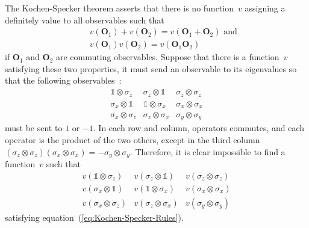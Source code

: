 \documentclass[english,reprint, aps, prl,superscriptaddress, showpacs,
showkeys]{revtex4-1}
\theoremstyle{plain}
\theoremstyle{definition}
\begin{document}
The Kochen-Specker theorem asserts that there is no function~$v$
assigning a definitely value to all observables such that \begin{subequations}
\label{eq:Kochen-Specker-Rules} 
\begin{eqnarray}
 &  & v\left(\mathbf{O}_{1}\right)+v\left(\mathbf{O}_{2}\right)=v\left(\mathbf{O}_{1}+\mathbf{O}_{2}\right)\textrm{ and}\\
 &  & v\left(\mathbf{O}_{1}\right)v\left(\mathbf{O}_{2}\right)=v\left(\mathbf{O}_{1}\mathbf{O}_{2}\right)
\end{eqnarray}
\end{subequations} if $\mathbf{O}_{1}$ and $\mathbf{O}_{2}$ are
commuting observables. Suppose that there is a function~$v$ satisfying
these two properties, it must send an observable to its eigenvalues
so that the following observables~\citep{Mermin1990Simple,peres1995quantum}:
\begin{equation}
\begin{array}{ccc}
\mathbb{1}\otimes\sigma_{z} & \sigma_{z}\otimes\mathbb{1} & \sigma_{z}\otimes\sigma_{z}\\
\sigma_{x}\otimes\mathbb{1} & \mathbb{1}\otimes\sigma_{x} & \sigma_{x}\otimes\sigma_{x}\\
\sigma_{x}\otimes\sigma_{z} & \sigma_{z}\otimes\sigma_{x} & \sigma_{y}\otimes\sigma_{y}
\end{array}\label{eq:MerminSquare}
\end{equation}
must be sent to $1$ or $-1$. In each row and column, operators commutes,
and each operator is the product of the two others, except in the
third column $\left(\sigma_{z}\otimes\sigma_{z}\right)\left(\sigma_{x}\otimes\sigma_{x}\right)=-\sigma_{y}\otimes\sigma_{y}$.
Therefore, it is clear impossible to find a function~$v$ such that
\begin{equation}
\begin{array}{ccc}
v\left(\mathbb{1}\otimes\sigma_{z}\right) & v\left(\sigma_{z}\otimes\mathbb{1}\right) & v\left(\sigma_{z}\otimes\sigma_{z}\right)\\
v\left(\sigma_{x}\otimes\mathbb{1}\right) & v\left(\mathbb{1}\otimes\sigma_{x}\right) & v\left(\sigma_{x}\otimes\sigma_{x}\right)\\
v\left(\sigma_{x}\otimes\sigma_{z}\right) & v\left(\sigma_{z}\otimes\sigma_{x}\right) & v\left(\sigma_{y}\otimes\sigma_{y}\right)
\end{array}\label{eq:MerminSquare-values}
\end{equation}
satisfying equation~(\ref{eq:Kochen-Specker-Rules}).
\end{document}
